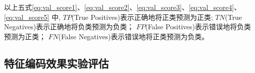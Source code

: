 

以上五式\ref{eq:val_score1}、\ref{eq:val_score2}、\ref{eq:val_score3}、\ref{eq:val_score4}、\ref{eq:val_score5}%
中,
  $TP$(True Positives)表示正确地将正类预测为正类;
  $TN$(True Negatives)表示正确地将负类预测为负类；
  $FP$(False Positives)表示错误地将负类预测为正类；
  $FN$(False Negatives)表示错误地将正类预测为负类。

\subsection{特征编码效果实验评估}

